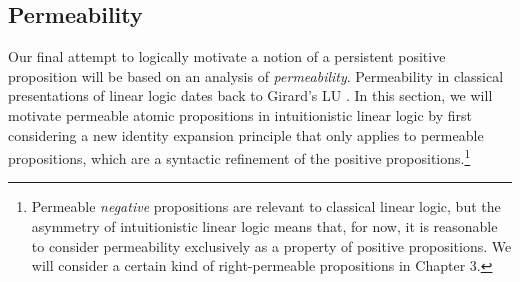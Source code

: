

\subsection{Permeability}
\label{sec:permeable}

Our final attempt to
logically motivate a notion of a persistent positive proposition will
be based on an analysis of {\it permeability}.  Permeability in
classical presentations of linear logic dates back to Girard's LU
\cite{girard93unity}.  In this section, we will motivate permeable
atomic propositions in intuitionistic linear logic by first
considering a new identity expansion principle that only applies to
permeable propositions, which are a syntactic refinement of the
positive propositions.\footnote{Permeable {\it negative} propositions
  are relevant to classical linear logic, but the asymmetry of
  intuitionistic linear logic means that, for now, it is reasonable to
  consider permeability exclusively as a property of positive
  propositions. We will consider a certain kind of right-permeable
  propositions in Chapter 3.}

